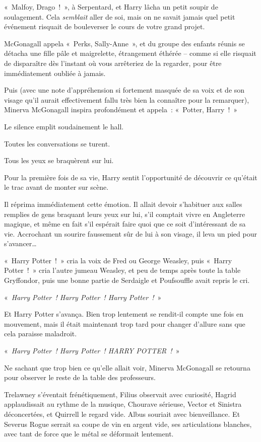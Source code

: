 «~Malfoy, Drago~!~», à Serpentard, et Harry lâcha un petit soupir de soulagement.
Cela \emph{semblait} aller de soi, mais on ne savait jamais quel petit événement risquait de bouleverser le cours de votre grand projet.

McGonagall appela «~Perks, Sally-Anne~», et du groupe des enfants réunis se détacha une fille pâle et maigrelette, étrangement éthérée -- comme si elle risquait de disparaître dès l'instant où vous arrêteriez de la regarder, pour être immédiatement oubliée à jamais.

Puis (avec une note d'appréhension si fortement masquée de sa voix et de son visage qu'il aurait effectivement fallu très bien la connaître pour la remarquer), Minerva McGonagall inspira profondément et appela~: «~Potter, Harry~!~»

Le silence emplit soudainement le hall.

Toutes les conversations se turent.

Tous les yeux se braquèrent sur lui.

Pour la première fois de sa vie, Harry sentit l'opportunité de découvrir ce qu'était le trac avant de monter sur scène.

Il réprima immédiatement cette émotion.
Il allait devoir s'habituer aux salles remplies de gens braquant leurs yeux sur lui, s'il comptait vivre en Angleterre magique,
et même en fait s'il espérait faire quoi que ce soit d'intéressant de sa vie.
Accrochant un sourire faussement sûr de lui à son visage, il leva un pied pour s'avancer…

«~Harry Potter~!~» cria la voix de Fred ou George Weasley, puis «~Harry Potter~!~» cria l'autre jumeau Weasley, et peu de temps après toute la table Gryffondor, puis une bonne partie de Serdaigle et Poufsouffle avait repris le cri.

«~\emph{Harry Potter~! Harry Potter~! Harry Potter~!}~»

Et Harry Potter s'avança.
Bien trop lentement se rendit-il compte une fois en mouvement, mais il était maintenant trop tard pour changer d'allure sans que cela paraisse maladroit.

\later

«~\emph{Harry Potter~! Harry Potter~! HARRY POTTER~!}~»

Ne sachant que trop bien ce qu'elle allait voir, Minerva McGonagall se retourna pour observer le reste de la table des professeurs.

Trelawney s'éventait frénétiquement, Filius observait avec curiosité, Hagrid applaudissait au rythme de la musique, Chourave sérieuse, Vector et Sinistra déconcertées, et Quirrell le regard vide.
Albus souriait avec bienveillance.
Et Severus Rogue serrait sa coupe de vin en argent vide, ses articulations blanches, avec tant de force que le métal se déformait lentement.

